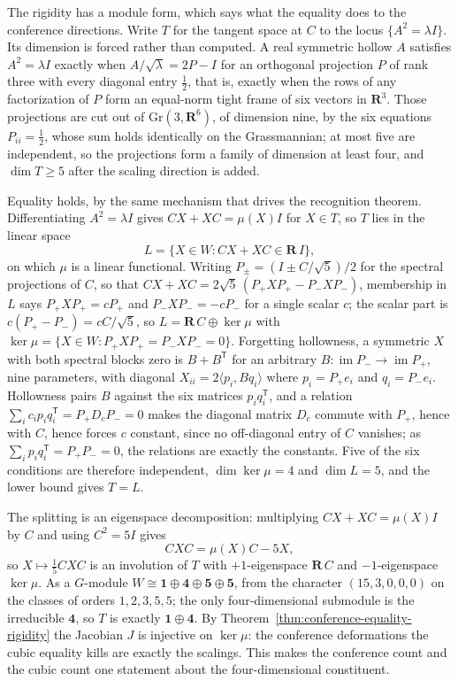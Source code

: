 The rigidity has a module form, which says what the equality does to the
conference directions.  Write \(T\) for the tangent space at \(C\) to the locus
\(\{A^2=\lambda I\}\).  Its dimension is forced rather than computed.  A real
symmetric hollow \(A\) satisfies \(A^2=\lambda I\) exactly when
\(A/\sqrt\lambda=2P-I\) for an orthogonal projection \(P\) of rank three with
every diagonal entry \(\tfrac12\), that is, exactly when the rows of any
factorization of \(P\) form an equal-norm tight frame of six vectors in
\(\mathbf R^3\).  Those projections are cut out of \(\mathrm{Gr}(3,\mathbf R^6)\),
of dimension nine, by the six equations \(P_{ii}=\tfrac12\), whose sum holds
identically on the Grassmannian; at most five are independent, so the projections
form a family of dimension at least four, and \(\dim T\ge5\) after the scaling
direction is added.

Equality holds, by the same mechanism that drives the recognition theorem.
Differentiating \(A^2=\lambda I\) gives \(CX+XC=\mu(X)I\) for \(X\in T\), so
\(T\) lies in the linear space
\[
 L=\{X\in W:CX+XC\in\mathbf R\,I\},
\]
on which \(\mu\) is a linear functional.  Writing \(P_\pm=(I\pm C/\sqrt5)/2\)
for the spectral projections of \(C\), so that
\(CX+XC=2\sqrt5\,(P_+XP_+-P_-XP_-)\), membership in \(L\) says
\(P_+XP_+=cP_+\) and \(P_-XP_-=-cP_-\) for a single scalar \(c\); the scalar
part is \(c(P_+-P_-)=cC/\sqrt5\), so \(L=\mathbf R\,C\oplus\ker\mu\) with
\(\ker\mu=\{X\in W:P_+XP_+=P_-XP_-=0\}\).  Forgetting hollowness, a symmetric
\(X\) with both spectral blocks zero is \(B+B^{\mathsf T}\) for an arbitrary
\(B\colon\operatorname{im}P_-\to\operatorname{im}P_+\), nine parameters, with
diagonal \(X_{ii}=2\langle p_i,Bq_i\rangle\) where \(p_i=P_+e_i\) and
\(q_i=P_-e_i\).  Hollowness pairs \(B\) against the six matrices
\(p_iq_i^{\mathsf T}\), and a relation
\(\sum_ic_ip_iq_i^{\mathsf T}=P_+D_cP_-=0\) makes the diagonal matrix \(D_c\)
commute with \(P_+\), hence with \(C\), hence forces \(c\) constant, since no
off-diagonal entry of \(C\) vanishes; as \(\sum_ip_iq_i^{\mathsf T}=P_+P_-=0\),
the relations are exactly the constants.  Five of the six conditions are
therefore independent, \(\dim\ker\mu=4\) and \(\dim L=5\), and the lower bound
gives \(T=L\).

The splitting is an eigenspace decomposition: multiplying \(CX+XC=\mu(X)I\)
by \(C\) and using \(C^2=5I\) gives
\[
 CXC=\mu(X)C-5X,
\]
so \(X\mapsto\tfrac15CXC\) is an involution of \(T\) with \(+1\)-eigenspace
\(\mathbf R\,C\) and \(-1\)-eigenspace \(\ker\mu\).  As a \(G\)-module
\(W\cong\mathbf1\oplus\mathbf4\oplus\mathbf5\oplus\mathbf5\), from the
character \((15,3,0,0,0)\) on the classes of orders \(1,2,3,5,5\); the only
four-dimensional submodule is the irreducible \(\mathbf4\), so \(T\) is
exactly \(\mathbf1\oplus\mathbf4\).  By
Theorem~\ref{thm:conference-equality-rigidity} the Jacobian \(J\) is injective on
\(\ker\mu\): the conference deformations the cubic equality kills are exactly
the scalings.  This makes the conference count and the cubic count one
statement about the four-dimensional constituent.

